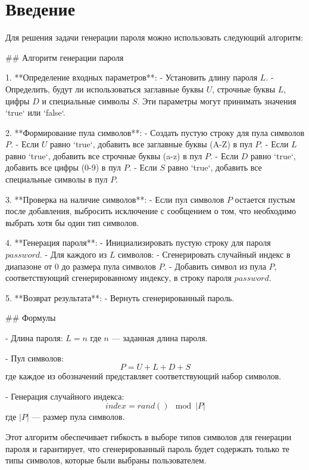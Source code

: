 \documentclass[14pt,a4paper]{scrartcl}
\begin{document}
\section{Введение}
Для решения задачи генерации пароля можно использовать следующий алгоритм:

## Алгоритм генерации пароля

1. **Определение входных параметров**:
   - Установить длину пароля $ L $.
   - Определить, будут ли использоваться заглавные буквы $ U $, строчные буквы $ L $, цифры $ D $ и специальные символы $ S $. Эти параметры могут принимать значения `true` или `false`.

2. **Формирование пула символов**:
   - Создать пустую строку для пула символов $ P $.
   - Если $ U $ равно `true`, добавить все заглавные буквы (A-Z) в пул $ P $.
   - Если $ L $ равно `true`, добавить все строчные буквы (a-z) в пул $ P $.
   - Если $ D $ равно `true`, добавить все цифры (0-9) в пул $ P $.
   - Если $ S $ равно `true`, добавить все специальные символы в пул $ P $.

3. **Проверка на наличие символов**:
   - Если пул символов $ P $ остается пустым после добавления, выбросить исключение с сообщением о том, что необходимо выбрать хотя бы один тип символов.

4. **Генерация пароля**:
   - Инициализировать пустую строку для пароля $ password $.
   - Для каждого из $ L $ символов:
     - Сгенерировать случайный индекс в диапазоне от 0 до размера пула символов $ P $.
     - Добавить символ из пула $ P $, соответствующий сгенерированному индексу, в строку пароля $ password $.

5. **Возврат результата**:
   - Вернуть сгенерированный пароль.

## Формулы

- Длина пароля: 
  $
  L = n
  $
  где $ n $ — заданная длина пароля.

- Пул символов:
  $$
  P = U + L + D + S
  $$
  где каждое из обозначений представляет соответствующий набор символов.

- Генерация случайного индекса:
  $$
  index = rand() \mod |P|
  $$
  где $ |P| $ — размер пула символов.

Этот алгоритм обеспечивает гибкость в выборе типов символов для генерации пароля и гарантирует, что сгенерированный пароль будет содержать только те типы символов, которые были выбраны пользователем.

\newpage
\end{document}
